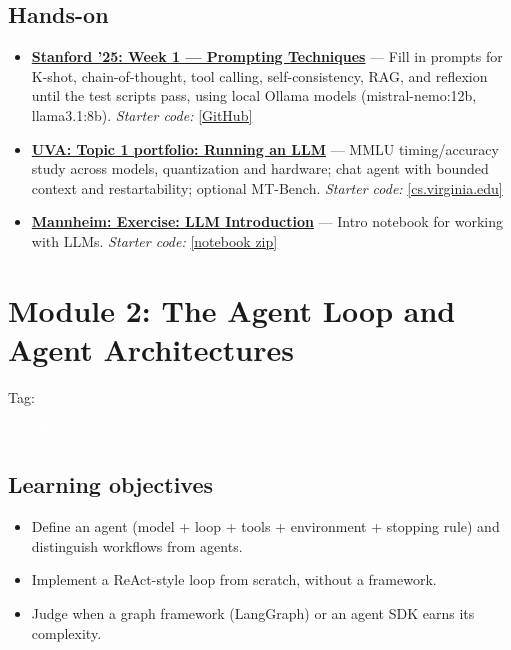 \documentclass[10pt,oneside]{report}
\newcommand{\tg}[1]{{\setlength{\fboxsep}{1.2pt}\colorbox{tag#1}{\kern1pt\textcolor{white}{\sffamily\bfseries\fontsize{5.5}{6}\selectfont\strut #1}\kern1.5pt}}}
\begin{document}
\section{Hands-on}
\begin{itemize}
\item \hyperlink{asg-STAN25-1}{\textbf{Stanford '25: Week 1 --- Prompting Techniques}} --- Fill in prompts for K-shot, chain-of-thought, tool calling, self-consistency, RAG, and reflexion until the test scripts pass, using local Ollama models (mistral-nemo:12b, llama3.1:8b). \textit{Starter code:} \href{https://github.com/mihail911/modern-software-dev-assignments/tree/fall2025/week1}{[GitHub]}
\item \hyperlink{asg-UVA-1}{\textbf{UVA: Topic 1 portfolio: Running an LLM}} --- MMLU timing/accuracy study across models, quantization and hardware; chat agent with bounded context and restartability; optional MT-Bench. \textit{Starter code:} \href{https://www.cs.virginia.edu/\%7Ermw7my/Courses/AgenticAISpring2026/Topic1Running/Running_an_LLM.html}{[cs.virginia.edu]}
\item \hyperlink{asg-MANN-1}{\textbf{Mannheim: Exercise: LLM Introduction}} --- Intro notebook for working with LLMs. \textit{Starter code:} \href{https://www.uni-mannheim.de/media/Einrichtungen/dws/Files_Teaching/Large_Language_Models_and_Agents/FSS2026/IE685_LA_EX_LLM_Introduction.ipynb.zip}{[notebook zip]}
\end{itemize}
\chapter{Module 2: The Agent Loop and Agent Architectures}\hypertarget{mod-ARCH}{}
{\small Tag: \tg{ARCH}}
\section{Learning objectives}
\begin{itemize}
\item Define an agent (model + loop + tools + environment + stopping rule) and distinguish workflows from agents.
\item Implement a ReAct-style loop from scratch, without a framework.
\item Judge when a graph framework (LangGraph) or an agent SDK earns its complexity.
\end{itemize}
\end{document}
